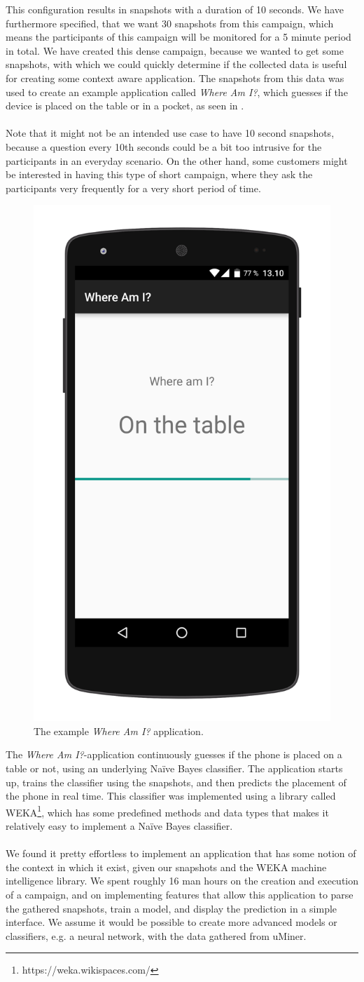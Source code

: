 This configuration results in snapshots with a duration of 10 seconds. We have furthermore specified, that we want 30 snapshots from this campaign, which means the participants of this campaign will be monitored for a 5 minute period in total. We have created this dense campaign, because we wanted to get some snapshots, with which we could quickly determine if the collected data is useful for creating some context aware application. The snapshots from this data was used to create an example application called \emph{Where Am I?}, which guesses if the device is placed on the table or in a pocket, as seen in .
\\\\
Note that it might not be an intended use case to have 10 second snapshots, because a question every 10th seconds could be a bit too intrusive for the participants in an everyday scenario. On the other hand, some customers might be interested in having this type of short campaign, where they ask the participants very frequently for a very short period of time. 

\begin{figure}[!htbp]
    \centering
    \includegraphics[width=.35\textwidth ]{graphic/quality_assurance/where_am_i_app.png}
    \caption{The example \emph{Where Am I?} application.}
    \label{fig:where_am_i_app}
\end{figure}
\FloatBarrier

The \emph{Where Am I?}-application continuously guesses if the phone is placed on a table or not, using an underlying Naïve Bayes classifier. The application starts up, trains the classifier using the snapshots, and then predicts the placement of the phone in real time. This classifier was implemented using a library called WEKA\footnote{https://weka.wikispaces.com/}, which has some predefined methods and data types that makes it relatively easy to implement a Naïve Bayes classifier.
\\\\
We found it pretty effortless to implement an application that has some notion of the context in which it exist, given our snapshots and the WEKA machine intelligence library. We spent roughly 16 man hours on the creation and execution of a campaign, and on implementing features that allow this application to parse the gathered snapshots, train a model, and display the prediction in a simple interface. We assume it would be possible to create more advanced models or classifiers, e.g. a neural network, with the data gathered from uMiner.